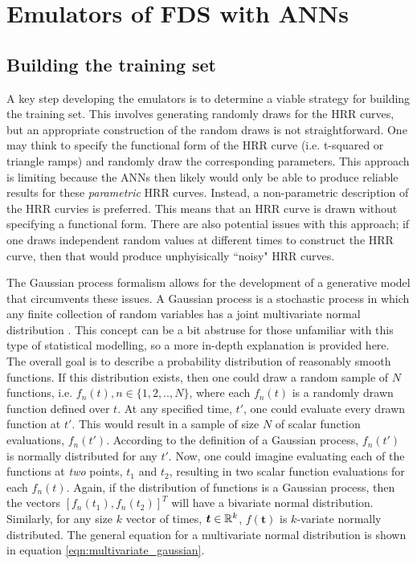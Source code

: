 \documentclass{article}
\begin{document}
\section{Emulators of FDS with ANNs}
\subsection{Building the training set}
A key step developing the emulators is to determine a viable strategy for building the training set. This involves generating randomly draws for the HRR curves, but an appropriate construction of the random draws is not straightforward. One may think to specify the functional form of the HRR curve (i.e. t-squared or triangle ramps) and randomly draw the corresponding parameters. This approach is limiting because the ANNs then likely would only be able to produce reliable results for these \textit{parametric} HRR curves. Instead, a non-parametric description of the HRR curvies is preferred. This means that an HRR curve is drawn without specifying a functional form. There are also potential issues with this approach; if one draws independent random values at different times to construct the HRR curve, then that would produce unphyisically ``noisy" HRR curves.

The Gaussian process formalism allows for the development of a generative model that circumvents these issues. A Gaussian process is a stochastic process in which any finite collection of random variables has a joint multivariate normal distribution \cite{lee2017deep}. This concept can be a bit abstruse for those unfamiliar with this type of statistical modelling, so a more in-depth explanation is provided here. The overall goal is to describe a probability distribution of reasonably smooth functions. If this distribution exists, then one could draw a random sample of $N$ functions, i.e. $f_n(t), n \in \{1,2,.., N\}$, where each $f_n(t)$ is a randomly drawn function defined over $t$. At any specified time, $t'$, one could evaluate every drawn function at $t'$.  This would result in a sample of size $N$ of scalar function evaluations, $f_n(t')$. According to the definition of a Gaussian process, $f_n(t')$ is normally distributed for any $t'$. Now, one could imagine evaluating each of the functions at \textit{two} points, $t_1$ and $t_2$, resulting in two scalar function evaluations for each $f_n(t)$. Again, if the distribution of functions is a Gaussian process, then the vectors $[f_n(t_1), f_n(t_2)]^T$ will have a bivariate normal distribution. Similarly, for any size $k$ vector of times, $\boldsymbol{t} \in \mathbb{R}^k$, $f(\boldsymbol{t})$ is $k$-variate normally distributed. The general equation for a multivariate normal distribution is shown in equation \ref{eqn:multivariate_gaussian}.
\end{document}
